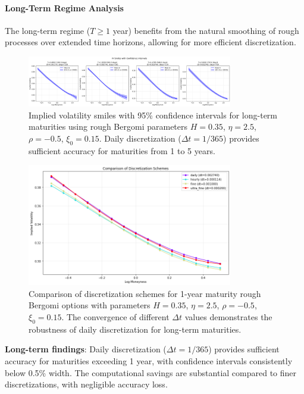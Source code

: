 	\paragraph{Long-Term Regime Analysis}
	
	The long-term regime ($T \geq 1$ year) benefits from the natural smoothing of rough processes over extended time horizons, allowing for more efficient discretization.
	
	\begin{figure}[ht]
		\centering
		\includegraphics[width=0.8\textwidth]{../images/long_regime_discretization_confidence.png}
		\caption{Implied volatility smiles with 95\% confidence intervals for long-term maturities using rough Bergomi parameters $H = 0.35$, $\eta = 2.5$, $\rho = -0.5$, $\xi_0 = 0.15$. Daily discretization ($\Delta t = 1/365$) provides sufficient accuracy for maturities from 1 to 5 years.}
		\label{fig:discretization-long}
	\end{figure}
	
	\begin{figure}[ht]
		\centering
		\includegraphics[width=0.8\textwidth]{../images/long_regime_discretization_schemes.png}
		\caption{Comparison of discretization schemes for 1-year maturity rough Bergomi options with parameters $H = 0.35$, $\eta = 2.5$, $\rho = -0.5$, $\xi_0 = 0.15$. The convergence of different $\Delta t$ values demonstrates the robustness of daily discretization for long-term maturities.}
		\label{fig:discretization-schemes-long}
	\end{figure}
	
	\textbf{Long-term findings}: Daily discretization ($\Delta t = 1/365$) provides sufficient accuracy for maturities exceeding 1 year, with confidence intervals consistently below 0.5\% width. The computational savings are substantial compared to finer discretizations, with negligible accuracy loss.
	
